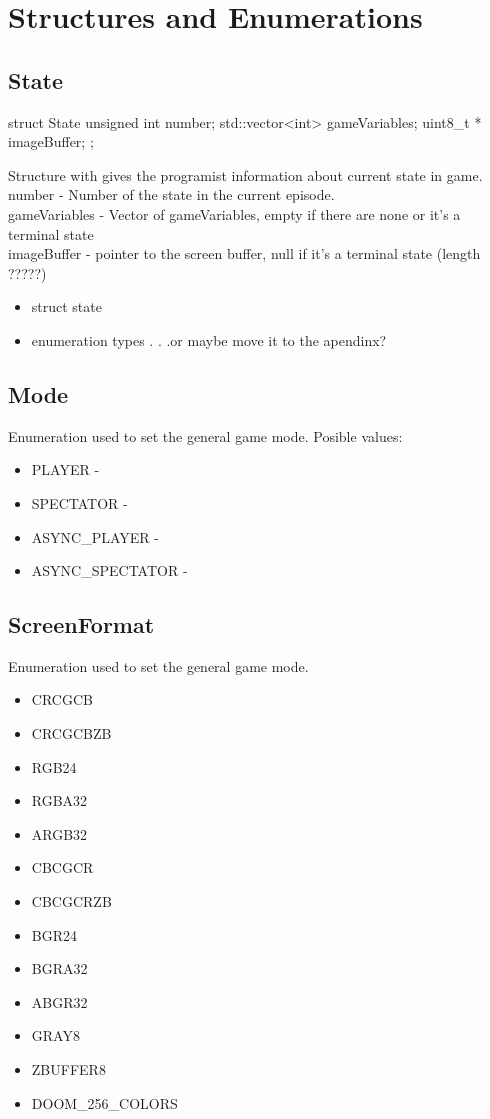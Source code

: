 \section{Structures and Enumerations} \label{sec:structs}
\subsection{State}	
\begin{clinee}
	struct State {
	    unsigned int number; 
	    std::vector<int> gameVariables;
	    uint8_t * imageBuffer;
	};
	\end{clinee}
Structure with gives the programist information about current state in game.\\
number - Number of the state in the current episode.\\
gameVariables - Vector of gameVariables, empty if there are none or it's a terminal state\\
imageBuffer - pointer to the screen buffer, null if it's a terminal state (length ?????)
\begin{itemize}
\item struct state
\item enumeration types . . .or maybe move it to the apendinx?
\end{itemize}
\subsection{Mode}
Enumeration used to set the general game mode.
Posible values:
\begin{itemize}
\item PLAYER - 
\item SPECTATOR -
\item ASYNC\_PLAYER -
\item ASYNC\_SPECTATOR -
\end{itemize}
\subsection{ScreenFormat}
Enumeration used to set the general game mode.
\begin{itemize}
 \item CRCGCB 
 \item CRCGCBZB
 \item RGB24
 \item RGBA32
 \item ARGB32
 \item CBCGCR
 \item CBCGCRZB
 \item BGR24
 \item BGRA32
 \item ABGR32
 \item GRAY8
 \item ZBUFFER8
 \item DOOM\_256\_COLORS
\end{itemize}
